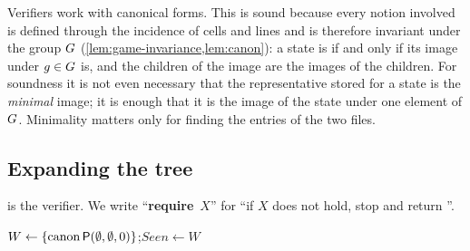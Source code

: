 Verifiers work with canonical forms. This is sound because every notion involved is defined through the
incidence of cells and lines and is therefore invariant under the group $G$
(\cref{lem:game-invariance,lem:canon}): a state is \WON{} if and only if its image under $g\in G$ is, and
the children of the image are the images of the children. For soundness it is not even necessary that
the representative stored for a state is the \emph{minimal} image; it is enough that it is the image of the state under one element of $G$. Minimality
matters only for finding the entries of the two files.

\subsection{Expanding the tree}\label{ssec:algverify}

 is the verifier. We write ``\textbf{require}~$X$'' for ``if $X$ does not hold, stop and
return \reject''.

\begin{algorithm}[t]
\DontPrintSemicolon
{}
$W\gets\{\operatorname{canon}\mathsf{P}(\emptyset,\emptyset,0)\}$;\quad $\mathit{Seen}\gets W$\;
\Return \accept\;
\BlankLine
{}
\caption{Verification of a certificate $(\Tbl,\Lv,\Rmax)$ by exhaustive expansion from the root.}
\label{alg:verify}
\end{algorithm}

